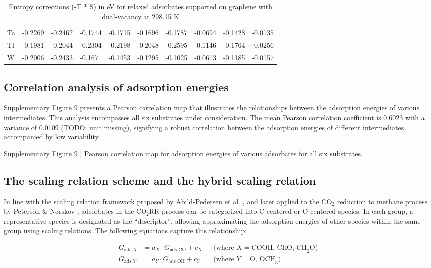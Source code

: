 \begin{table}[h]
{\begin{tabular}{*{10}{l}}
      Ta & -0.2269 & -0.2462 & -0.1744 & -0.1715 & -0.1696 & -0.1787 & -0.0694 & -0.1428 & -0.0135 \\
      Tl & -0.1981 & -0.2044 & -0.2304 & -0.2198 & -0.2048 & -0.2595 & -0.1146 & -0.1764 & -0.0256 \\
      W  & -0.2006 & -0.2433 & -0.167  & -0.1453 & -0.1295 & -0.1025 & -0.0613 & -0.1185 & -0.0157 \\
      \hline
  \end{tabular}
  }
  \caption{Entropy corrections (-T * S) in eV for relaxed adsorbates supported on graphene with dual-vacancy at 298.15 K}
  \label{si_table12}
\end{table}


\subsection{Correlation analysis of adsorption energies}
Supplementary Figure 9 presents a Pearson correlation map that illustrates the relationships between the adsorption energies of various intermediates. This analysis encompasses all six substrates under consideration. The mean Pearson correlation coefficient is 0.6023 with a variance of 0.0109 (TODO: unit missing), signifying a robust correlation between the adsorption energies of different intermediates, accompanied by low variability.


Supplementary Figure 9 | Pearson correlation map for adsorption energies of various adsorbates for all six substrates.


\subsection{The scaling relation scheme and the hybrid scaling relation}
In line with the scaling relation framework proposed by Abild-Pedersen et al. \cite{abild2007scaling}, and later applied to the CO$_2$ reduction to methane process by Peterson \& Nørskov \cite{peterson2012activity}, adsorbates in the CO$_2$RR process can be categorized into C-centered or O-centered species. In each group, a representative species is designated as the “descriptor”, allowing approximating the adsorption energies of other species within the same group using scaling relations. The following equations capture this relationship:

\begin{align}
  G_{\text{ads } X} &= a_X \cdot G_{\text{ads CO}} + c_X  && \text{(where } X = \text{COOH, CHO, CH}_2\text{O}) \\
  G_{\text{ads } Y} &= a_Y \cdot G_{\text{ads OH}} + c_Y  && \text{(where } Y = \text{O, OCH}_3\text{)}
\end{align}

